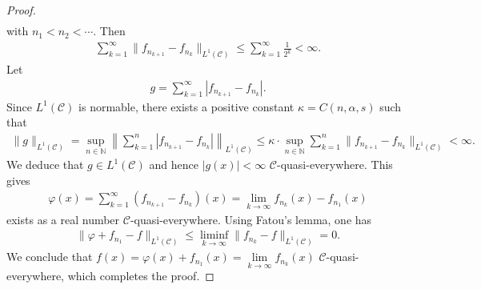 \documentclass[10pt,reqno]{amsart}
\numberwithin{equation}{section}
\begin{document}
\begin{proof}
\begin{align*}
\end{align*}
with $n_{1}<n_{2}<\cdots$. Then
\begin{align*}
\sum_{k=1}^{\infty}\|f_{n_{k+1}}-f_{n_{k}}\|_{L^{1}(\mathcal{C})}\leq\sum_{k=1}^{\infty}\frac{1}{2^{k}}<\infty.
\end{align*}
Let
\begin{align*}
g=\sum_{k=1}^{\infty}|f_{n_{k+1}}-f_{n_{k}}|.
\end{align*}
Since $L^{1}(\mathcal{C})$ is normable, there exists a positive constant $\kappa=C(n,\alpha,s)$ such that 
\begin{align*}
\|g\|_{L^{1}(\mathcal{C})}=\sup_{n\in\mathbb{N}}\left\|\sum_{k=1}^{n}|f_{n_{k+1}}-f_{n_{k}}|\right\|_{L^{1}(\mathcal{C})}\leq\kappa\cdot\sup_{n\in\mathbb{N}}\sum_{k=1}^{n}\|f_{n_{k+1}}-f_{n_{k}}\|_{L^{1}(\mathcal{C})}<\infty.
\end{align*}
We deduce that $g\in L^{1}(\mathcal{C})$ and hence $|g(x)|<\infty$ $\mathcal{C}$-quasi-everywhere. This gives
\begin{align*}
\varphi(x)=\sum_{k=1}^{\infty}(f_{n_{k+1}}-f_{n_{k}})(x)=\lim_{k\rightarrow\infty}f_{n_{k}}(x)-f_{n_{1}}(x)
\end{align*}
exists as a real number $\mathcal{C}$-quasi-everywhere. Using Fatou's lemma, one has 
\begin{align*}
\|\varphi+f_{n_{1}}-f\|_{L^{1}(\mathcal{C})}\leq\liminf_{k\rightarrow\infty}\|f_{n_{k}}-f\|_{L^{1}(\mathcal{C})}=0.
\end{align*}
We conclude that $f(x)=\varphi(x)+f_{n_{1}}(x)=\lim\limits_{k\rightarrow\infty}f_{n_{k}}(x)$ $\mathcal{C}$-quasi-everywhere, which completes the proof.
\end{proof}
\end{document}
